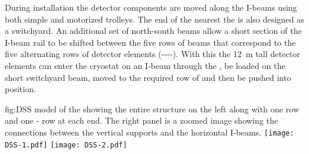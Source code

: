 During installation the detector components are moved along the I-beams using both simple and motorized trolleys. 
The end of the  nearest the  is also designed as a switchyard. An additional set of north-south beams allow a short section of the I-beam rail to be shifted between the five rows of  beams that correspond to the five alternating rows of detector elements  (----).  
With this the \SI{12}{m} tall detector elements can enter the cryostat on an I-beam through the , be loaded on the short switchyard beam, moved to the required row of  and then be pushed into position. 


\begin{dunefigure} {fig:DSS}
  {\threed model of the  showing the entire
  structure on the left along with one  row and one
  - row at each end. The right panel is a zoomed image
  showing the connections between the vertical supports and the
  horizontal I-beams.}
\texttt{[image: DSS-1.pdf]}
 \texttt{[image: DSS-2.pdf]}
\end{dunefigure}




